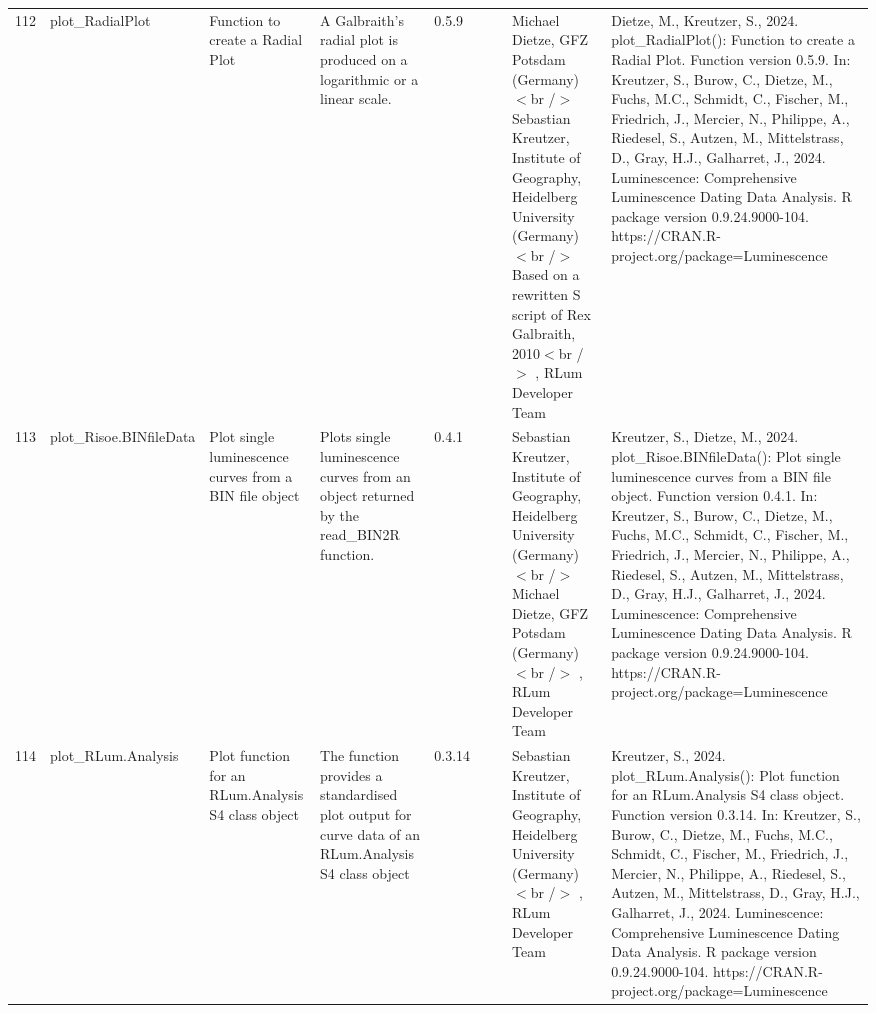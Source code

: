\begin{table}[ht]
\begin{tabular}{rllllllll}
 \\ 
  112 & plot\_RadialPlot & Function to create a Radial Plot & A Galbraith's radial plot is produced on a logarithmic or a linear scale. & 0.5.9
 &  &  & Michael Dietze, GFZ Potsdam (Germany) $<$br /$>$ Sebastian Kreutzer, Institute of Geography, Heidelberg University (Germany) $<$br /$>$ Based on a rewritten S script of Rex Galbraith, 2010$<$br /$>$ , RLum Developer Team & Dietze, M., Kreutzer, S., 2024. plot\_RadialPlot(): Function to create a Radial Plot. Function version 0.5.9. In: Kreutzer, S., Burow, C., Dietze, M., Fuchs, M.C., Schmidt, C., Fischer, M., Friedrich, J., Mercier, N., Philippe, A., Riedesel, S., Autzen, M., Mittelstrass, D., Gray, H.J., Galharret, J., 2024. Luminescence: Comprehensive Luminescence Dating Data Analysis. R package version 0.9.24.9000-104. https://CRAN.R-project.org/package=Luminescence
 \\ 
  113 & plot\_Risoe.BINfileData & Plot single luminescence curves from a BIN file object & Plots single luminescence curves from an object returned by the read\_BIN2R  function. & 0.4.1
 &  &  & Sebastian Kreutzer, Institute of Geography, Heidelberg University (Germany) $<$br /$>$ Michael Dietze, GFZ Potsdam (Germany)$<$br /$>$ , RLum Developer Team & Kreutzer, S., Dietze, M., 2024. plot\_Risoe.BINfileData(): Plot single luminescence curves from a BIN file object. Function version 0.4.1. In: Kreutzer, S., Burow, C., Dietze, M., Fuchs, M.C., Schmidt, C., Fischer, M., Friedrich, J., Mercier, N., Philippe, A., Riedesel, S., Autzen, M., Mittelstrass, D., Gray, H.J., Galharret, J., 2024. Luminescence: Comprehensive Luminescence Dating Data Analysis. R package version 0.9.24.9000-104. https://CRAN.R-project.org/package=Luminescence
 \\ 
  114 & plot\_RLum.Analysis & Plot function for an RLum.Analysis S4 class object & The function provides a standardised plot output for curve data of an RLum.Analysis S4 class object & 0.3.14
 &  &  & Sebastian Kreutzer, Institute of Geography, Heidelberg University (Germany)$<$br /$>$ , RLum Developer Team & Kreutzer, S., 2024. plot\_RLum.Analysis(): Plot function for an RLum.Analysis S4 class object. Function version 0.3.14. In: Kreutzer, S., Burow, C., Dietze, M., Fuchs, M.C., Schmidt, C., Fischer, M., Friedrich, J., Mercier, N., Philippe, A., Riedesel, S., Autzen, M., Mittelstrass, D., Gray, H.J., Galharret, J., 2024. Luminescence: Comprehensive Luminescence Dating Data Analysis. R package version 0.9.24.9000-104. https://CRAN.R-project.org/package=Luminescence
 \\ 

\end{tabular}
\end{table}
